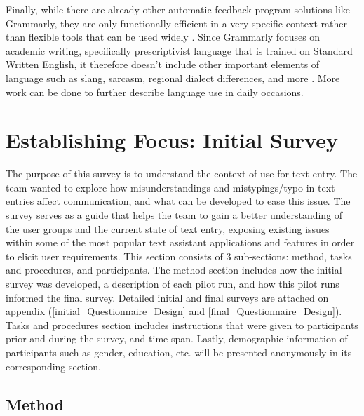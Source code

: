 \documentclass[acmsmall,screen,authorversion,nonacm]{acmart}
\begin{document}
Finally, while there are already other automatic feedback program solutions like Grammarly, they  are only functionally efficient in a very specific context rather than flexible tools that can be used widely \cite{grammarlyGood}. Since Grammarly focuses on academic writing, specifically prescriptivist language that is trained on Standard Written English, it therefore doesn't include other important elements of language such as slang, sarcasm, regional dialect differences, and more \cite{grammar2}. More work can be done to further describe language use in daily occasions.

\section{Establishing Focus: Initial Survey}

The purpose of this survey is to understand the context of use for text entry. The team wanted to explore how misunderstandings and mistypings/typo in text entries affect communication, and what can be developed to ease this issue. The survey serves as a guide that helps the team to gain a better understanding of the user groups and the current state of text entry, exposing existing issues within some of the most popular text assistant applications and features in order to elicit user requirements. This section consists of 3 sub-sections: method, tasks and procedures, and participants. The method section includes how the initial survey was developed, a description of each pilot run, and how this pilot runs informed the final survey. Detailed initial and final surveys are attached on appendix (\ref{initial_Questionnaire_Design} and \ref{final_Questionnaire_Design}). Tasks and procedures section includes instructions that were given to participants prior and during the survey, and time span. Lastly, demographic information of participants such as gender, education, etc. will be presented anonymously in its corresponding section. 

\subsection{Method}
\end{document}
